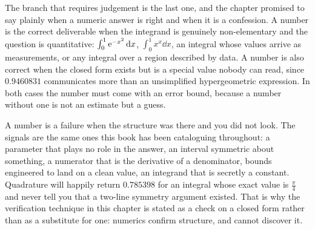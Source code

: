 \begin{center}
\end{center}

The branch that requires judgement is the last one, and the chapter promised to say plainly when a numeric answer is right and when it is a confession. A number is the correct deliverable when the integrand is genuinely non-elementary and the question is quantitative: $\int_0^{1}\mathrm{e}^{-x^{2}}\,\mathrm{d} x$, $\int_0^{1}x^{x}\dd x$, an integral whose values arrive as measurements, or any integral over a region described by data. A number is also correct when the closed form exists but is a special value nobody can read, since $0.9460831$ communicates more than an unsimplified hypergeometric expression. In both cases the number must come with an error bound, because a number without one is not an estimate but a guess.

A number is a failure when the structure was there and you did not look. The signals are the same ones this book has been cataloguing throughout: a parameter that plays no role in the answer, an interval symmetric about something, a numerator that is the derivative of a denominator, bounds engineered to land on a clean value, an integrand that is secretly a constant. Quadrature will happily return $0.785398$ for an integral whose exact value is $\tfrac{\pi}{4}$ and never tell you that a two-line symmetry argument existed. That is why the verification technique in this chapter is stated as a check on a closed form rather than as a substitute for one: numerics confirm structure, and cannot discover it.

